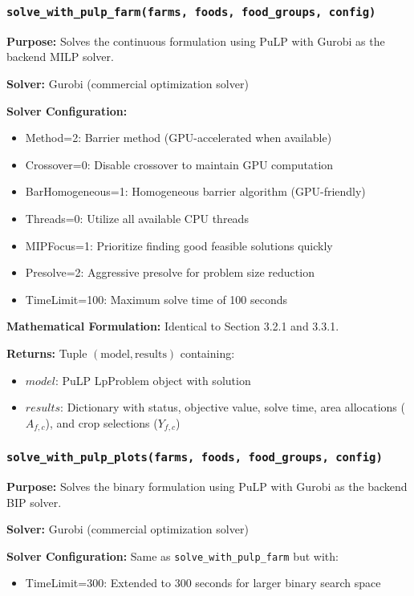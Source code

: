 \documentclass{article}
\begin{document}
\subsubsection{\texttt{solve\_with\_pulp\_farm(farms, foods, food\_groups, config)}}

\textbf{Purpose:} Solves the continuous formulation using PuLP with Gurobi as the backend MILP solver.

\textbf{Solver:} Gurobi (commercial optimization solver)

\textbf{Solver Configuration:}
\begin{itemize}
    \item Method=2: Barrier method (GPU-accelerated when available)
    \item Crossover=0: Disable crossover to maintain GPU computation
    \item BarHomogeneous=1: Homogeneous barrier algorithm (GPU-friendly)
    \item Threads=0: Utilize all available CPU threads
    \item MIPFocus=1: Prioritize finding good feasible solutions quickly
    \item Presolve=2: Aggressive presolve for problem size reduction
    \item TimeLimit=100: Maximum solve time of 100 seconds
\end{itemize}

\textbf{Mathematical Formulation:} Identical to Section 3.2.1 and 3.3.1.

\textbf{Returns:} Tuple $(\text{model}, \text{results})$ containing:
\begin{itemize}
    \item $model$: PuLP LpProblem object with solution
    \item $results$: Dictionary with status, objective value, solve time, area allocations ($A_{f,c}$), and crop selections ($Y_{f,c}$)
\end{itemize}

\subsubsection{\texttt{solve\_with\_pulp\_plots(farms, foods, food\_groups, config)}}

\textbf{Purpose:} Solves the binary formulation using PuLP with Gurobi as the backend BIP solver.

\textbf{Solver:} Gurobi (commercial optimization solver)

\textbf{Solver Configuration:} Same as \texttt{solve\_with\_pulp\_farm} but with:
\begin{itemize}
    \item TimeLimit=300: Extended to 300 seconds for larger binary search space
\end{itemize}
\end{document}
